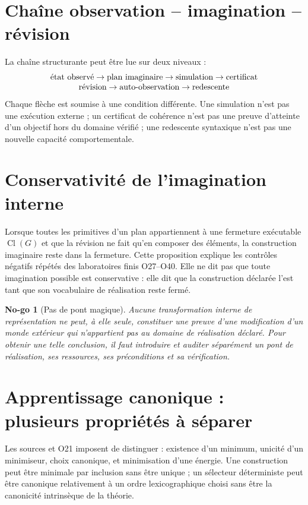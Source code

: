 \documentclass[11pt,a4paper,openany]{book}
\newtheorem{noGo}[definition]{No-go}
\newcommand{\cl}{\operatorname{Cl}}
\begin{document}
\section{Chaîne observation -- imagination -- révision}
La chaîne structurante peut être lue sur deux niveaux :
\[
\begin{array}{c}
\text{état observé}\to\text{plan imaginaire}\to\text{simulation}\to\text{certificat}
\cr
\text{révision}\to\text{auto-observation}\to\text{redescente}
\end{array}
\]
Chaque flèche est soumise à une condition différente. Une simulation n'est pas une exécution externe ; un certificat de cohérence n'est pas une preuve d'atteinte d'un objectif hors du domaine vérifié ; une redescente syntaxique n'est pas une nouvelle capacité comportementale.

\section{Conservativité de l'imagination interne}
Lorsque toutes les primitives d'un plan appartiennent à une fermeture exécutable $\cl(G)$ et que la révision ne fait qu'en composer des éléments, la construction imaginaire reste dans la fermeture. Cette proposition explique les contrôles négatifs répétés des laboratoires finis O27--O40. Elle ne dit pas que toute imagination possible est conservative : elle dit que la construction déclarée l'est tant que son vocabulaire de réalisation reste fermé.

\begin{noGo}[Pas de pont magique]
Aucune transformation interne de représentation ne peut, à elle seule, constituer une preuve d'une modification d'un monde extérieur qui n'appartient pas au domaine de réalisation déclaré. Pour obtenir une telle conclusion, il faut introduire et auditer séparément un pont de réalisation, ses ressources, ses préconditions et sa vérification.
\end{noGo}

\section{Apprentissage canonique : plusieurs propriétés à séparer}
Les sources et O21 imposent de distinguer : existence d'un minimum, unicité d'un minimiseur, choix canonique, et minimisation d'une énergie. Une construction peut être minimale par inclusion sans être unique ; un sélecteur déterministe peut être canonique relativement à un ordre lexicographique choisi sans être la canonicité intrinsèque de la théorie.
\end{document}
